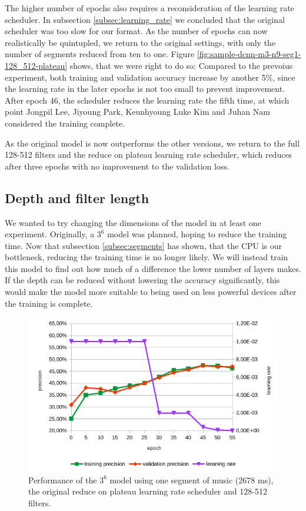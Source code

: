 The higher number of epochs also requires a reconsideration of the learning rate scheduler. In subsection \ref{subsec:learning_rate} we concluded that the original scheduler was too slow for our format. As the number of epochs can now realistically be quintupled, we return to the original settings, with only the number of segments reduced from ten to one. Figure \ref{fig:sample-dcnn-m3-n9-seg1-128_512-plateau} shows, that we were right to do so: Compared to the prevoius experiment, both training and validation accuracy increase by another 5\%, since the learning rate in the later epochs is not too small to prevent improvement. After epoch 46, the scheduler reduces the learning rate the fifth time, at which point Jongpil Lee, Jiyoung Park, Keunhyoung Luke Kim and Juhan Nam considered the training complete.

As the original model is now outperforms the other versions, we return to the full 128-512 filters and the reduce on plateau learning rate scheduler, which reduces after three epochs with no improvement to the validation loss.

\subsection{Depth and filter length}

We wanted to try changing the dimensions of the model in at least one experiment. Originally, a $3^6$ model was planned, hoping to reduce the training time. Now that subsection \ref{subsec:segments} has shown, that the CPU is our bottleneck, reducing the training time is no longer likely. We will instead train this model to find out how much of a difference the lower number of layers makes. If the depth can be reduced without lowering the accuracy significantly, this would make the model more suitable to being used on less powerful devices after the training is complete. 



\begin{figure}[!htb]
	\centering
	\includegraphics[width=.9\linewidth]{images/sample-dcnn-m3-n6-seg1-128_512-plateau.png}
	\caption{Performance of the $3^{6}$ model using one segment of music (2678 ms), the original reduce on plateau learning rate scheduler and 128-512 filters.}
	\label{fig:sample-dcnn-m3-n6-seg1-128_512-plateau}
\end{figure}

